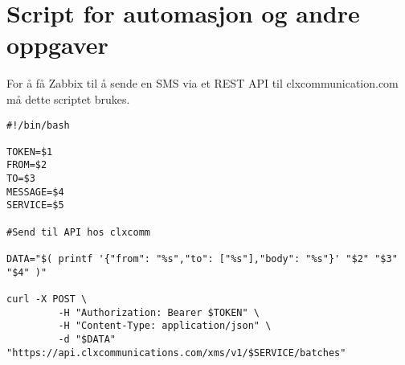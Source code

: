 \chapter{Script for automasjon og andre oppgaver}
\label{chap:script}
\lstset{language=bash}

For å få Zabbix til å sende en SMS via et REST API til clxcommunication.com må dette scriptet brukes. 
\begin{lstlisting}
#!/bin/bash

TOKEN=$1
FROM=$2
TO=$3
MESSAGE=$4
SERVICE=$5

#Send til API hos clxcomm

DATA="$( printf '{"from": "%s","to": ["%s"],"body": "%s"}' "$2" "$3" "$4" )"

curl -X POST \
         -H "Authorization: Bearer $TOKEN" \
         -H "Content-Type: application/json" \
         -d "$DATA" "https://api.clxcommunications.com/xms/v1/$SERVICE/batches"

\end{lstlisting}
    
